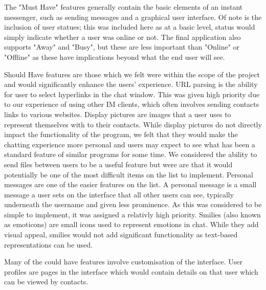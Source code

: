 The "Must Have" features generally contain the basic elements of an instant messenger, such as sending messages and a graphical user interface. Of note is the inclusion of user statues; this was included here as at a basic level, status would simply indicate whether a user was online or not. The final application also supports "Away" and "Busy", but these are less important than "Online" or "Offline" as these have implications beyond what the end user will see.

\newline

Should Have features are those which we felt were within the scope of the project and would significantly enhance the users' experience. URL parsing is the ability for user to select hyperlinks in the chat window. This was given high priority due to our experience of using other IM clients, which often involves sending contacts links to various websites. Display pictures are images that a user uses to represent themselves with to their contacts. While display pictures do not directly impact the functionality of the program, we felt that they would make the chatting experience more personal and users may expect to see what has been a standard feature of similar programs for some time. We considered the ability to send files between users to be a useful feature but were are that it would potentially be one of the most difficult items on the list to implement. Personal messages are one of the easier features on the list. A personal message is a small message a user sets on the interface that all other users can see, typically underneath the username and given less prominence. As this was considered to be simple to implement, it was assigned a relativly high priority. Smilies (also known as emoticons) are small icons used to represent emotions in chat. While they add visual appeal, smilies would not add significant functionality as text-based representations can be used.

\newline

Many of the could have features involve customisation of the interface. User profiles are pages in the interface which would contain details on that user which can be viewed by contacts. 




